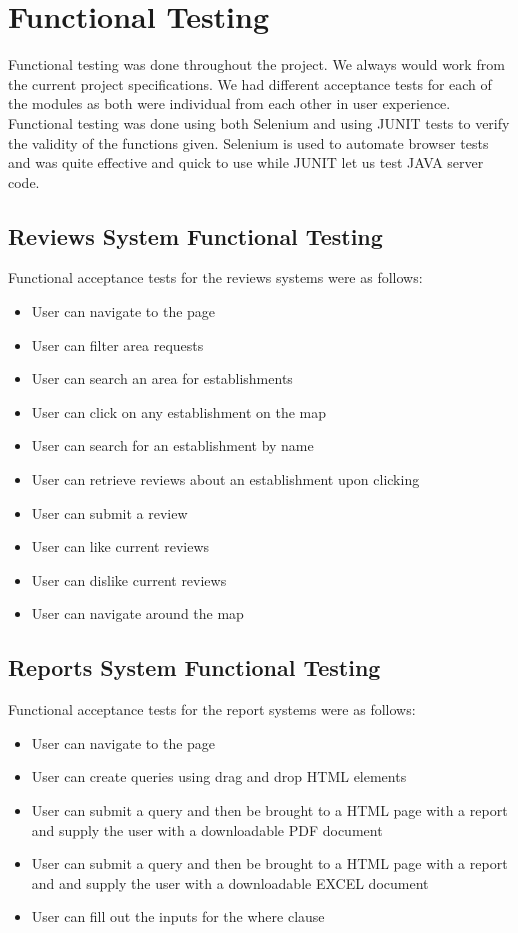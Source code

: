\section{Functional Testing}

Functional testing was done throughout the project. We always would work from the current project specifications. We had different acceptance tests for each of the modules as both were individual from each other in user experience. \newline \newline \noindent Functional testing was done using both Selenium and using JUNIT tests to verify the validity of the functions given. Selenium is used to automate browser tests and was quite effective and quick to use while JUNIT let us test JAVA server code. 

\subsection{Reviews System Functional Testing}

Functional acceptance tests for the reviews systems were as follows:

\begin{itemize}
	\item User can navigate to the page
	\item User can filter area requests
	\item User can search an area for establishments
	\item User can click on any establishment on the map
	\item User can search for an establishment by name
	\item User can retrieve reviews about an establishment upon clicking
	\item User can submit a review
	\item User can like current reviews
	\item User can dislike current reviews
	\item User can navigate around the map
\end{itemize}

\subsection{Reports System Functional Testing}

Functional acceptance tests for the report systems were as follows:

\begin{itemize}
	\item User can navigate to the page
	\item User can create queries using drag and drop HTML elements
	\item User can submit a query and then be brought to a HTML page with a report and supply the user with a downloadable PDF document
	\item User can submit a query and then be brought to a HTML page with a report and and supply the user with a downloadable EXCEL document
	\item User can fill out the inputs for the where clause
\end{itemize}

